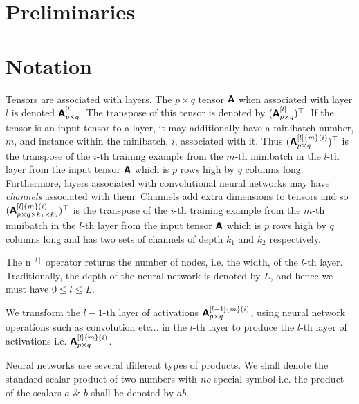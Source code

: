 \documentclass[modern]{aastex61}
\newcommand{\un}{\mathrm{n}}
\begin{document}

\section{Preliminaries} \label{sec:prelim}

\section{Notation} \label{sec:notation}


Tensors are associated with layers. The $p \times q$ tensor $\textbf{\textsf{A}}$ when associated with layer $l$ is denoted $\textbf{\textsf{A}}_{p \times q}^{[l]}$. The transpose of this tensor is denoted by $(\textbf{\textsf{A}}_{p \times q}^{[l]})^{\top}$. If the tensor is an input tensor to a layer, it may additionally have a minibatch number, $m$, and instance within the minibatch, $i$, associated with it. Thus $(\textbf{\textsf{A}}_{p \times q}^{[l]\{m\}(i)})^{\top}$ is the transpose of the $i$-th training example from the $m$-th minibatch in the $l$-th layer from the input tensor $\textbf{\textsf{A}}$ which is $p$ rows high by $q$ columns long. Furthermore, layers associated with convolutional neural networks may have \textit{channels} associated with them. Channels add extra dimensions to tensors and so $(\textbf{\textsf{A}}_{p \times q \times k_{1} \times k_{2}}^{[l]\{m\}(i)})^{\top}$ is the transpose of the $i$-th training example from the $m$-th minibatch in the $l$-th layer from the input tensor $\textbf{\textsf{A}}$ which is $p$ rows high by $q$ columns long and has two sets of channels of depth $k_{1}$ and $k_{2}$ respectively.

The $\un^{[l]}$ operator returns the number of nodes, i.e. the width, of the $l$-th layer. Traditionally, the depth of the neural network is denoted by $L$, and hence we must have $0 \leq l \leq L$.

We transform the $l-1$-th layer of activations $\textbf{\textsf{A}}_{p \times q}^{[l-1]\{m\}(i)}$, using neural network operations such as convolution etc... in the $l$-th layer to produce the $l$-th layer of activations i.e. $\textbf{\textsf{A}}_{p \times q}^{[l]\{m\}(i)}$.

Neural networks use several different types of products. We shall denote the standard scalar product of two numbers with \textit{no} special symbol i.e. the product of the scalars $a$ \& $b$ shall be denoted by $ab$.
\end{document}
